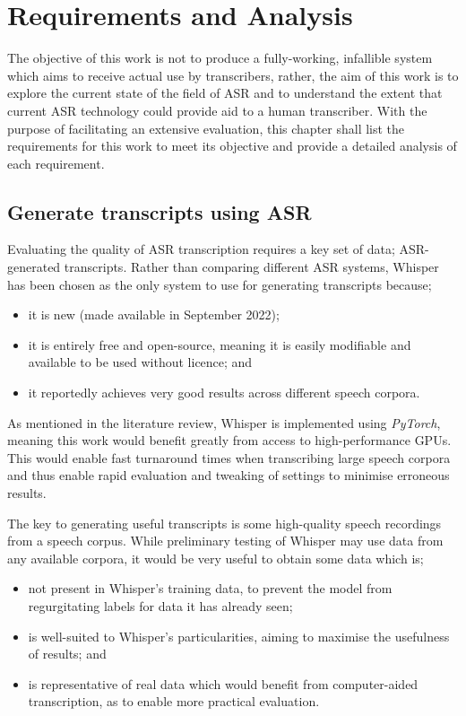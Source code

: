 \chapter{Requirements and Analysis}\label{ch:req-and-analysis}

The objective of this work is not to produce a fully-working, infallible system which aims to receive actual use by transcribers, rather, the aim of this work is to explore the current state of the field of ASR and to understand the extent that current ASR technology could provide aid to a human transcriber.
With the purpose of facilitating an extensive evaluation, this chapter shall list the requirements for this work to meet its objective and provide a detailed analysis of each requirement.

\section{Generate transcripts using ASR}\label{sec:generate-transcripts}

Evaluating the quality of ASR transcription requires a key set of data; ASR-generated transcripts.
Rather than comparing different ASR systems, Whisper\cite{whisper} has been chosen as the only system to use for generating transcripts because;

\begin{itemize}
        \item it is new (made available in September 2022);
        \item it is entirely free and open-source, meaning it is easily modifiable and available to be used without licence; and
        \item it reportedly achieves very good results across different speech corpora.
\end{itemize}

As mentioned in the literature review, Whisper is implemented using \emph{PyTorch}, meaning this work would benefit greatly from access to high-performance GPUs.
This would enable fast turnaround times when transcribing large speech corpora and thus enable rapid evaluation and tweaking of settings to minimise erroneous results.

The key to generating useful transcripts is some high-quality speech recordings from a speech corpus.
While preliminary testing of Whisper may use data from any available corpora, it would be very useful to obtain some data which is;

\begin{itemize}
        \item not present in Whisper's training data, to prevent the model from regurgitating labels for data it has already seen;
        \item is well-suited to Whisper's particularities, aiming to maximise the usefulness of results; and
        \item is representative of real data which would benefit from computer-aided transcription, as to enable more practical evaluation.
\end{itemize}

